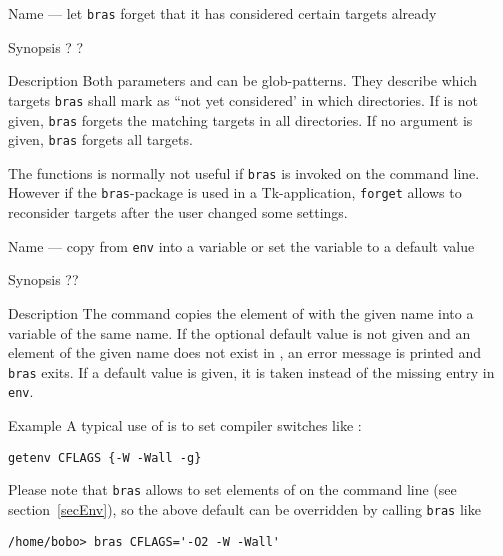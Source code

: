 \documentclass[11pt]{scrartcl}
\newcommand{\bras}{\texttt{bras}}
\begin{document}
\label{proc:forget}
\begin{Describe}
\item[Name]  --- let \bras{} forget that it has considered 
  certain targets already
\item[Synopsis]  ? ?
\item[Description] Both parameters  and  can be
  glob-patterns. They describe which targets \bras{} shall mark as ``not
  yet considered' in which directories. If  is not given,
  \bras{} forgets the matching targets in all directories. If no
  argument is given, \bras{} forgets all targets.
  
  The functions is normally not useful if \bras{} is invoked on the
  command line. However if the \bras-package is used in a
  Tk-application, \texttt{forget} allows to reconsider targets after
  the user changed some settings.
\end{Describe}
\begin{Describe}
\item[Name]  --- copy from \texttt{env} into a variable
  or set the variable to a default value
\item[Synopsis]   ??
\item[Description] The command copies the element of  with
  the given name into a variable of the same name. If the optional
  default value is not given and an element of the given name does not
  exist in , an error message is printed and \bras{} exits. If
  a default value is given, it is taken instead of the missing entry
  in \texttt{env}. 
\item[Example] A typical use of  is to set compiler
  switches like :
\begin{verbatim}
getenv CFLAGS {-W -Wall -g}
\end{verbatim}

Please note that \bras{} allows to set elements of  on the
command line (see section~\ref{secEnv}), so the above default can be
overridden by calling \bras{} like
\begin{verbatim}
/home/bobo> bras CFLAGS='-O2 -W -Wall'
\end{verbatim}
\end{Describe}
\end{document}
